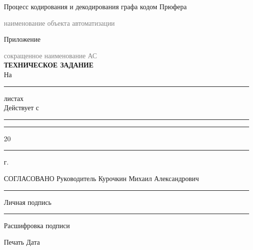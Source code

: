 \documentclass[12pt,a4paper]{article}
\begin{document}
\vspace{0.4cm}
\begin{center}
\large{Процесс кодирования и декодирования графа кодом Прюфера}
\end{center}
\vspace{-0.6cm}
\hrulefill
\begin{center}
\vspace{-0.4cm}
   \textcolor{gray}{\footnotesize{наименование объекта автоматизации}}
\end{center}
\vspace{0.4cm}
\begin{center}
\large{Приложение}
\end{center}
\vspace{-0.6cm}
\hrulefill
\begin{center}
\vspace{-0.4cm}
   \textcolor{gray}{\footnotesize{сокращенное наименование АС}}
   \\
   \vspace{0.8cm}
\Large{\textbf{ТЕХНИЧЕСКОЕ ЗАДАНИЕ}}\\
\vspace{0.6cm}
\normalsize
На \rule[0pt]{2cm}{0.5pt} листах\\
\vspace{0.3cm}
Действует с \guillemotleft \rule[0pt]{0.8cm}{0.5pt}\guillemotright \rule[0pt]{2cm}{0.5pt} 20\rule[0pt]{0.5cm}{0.5pt} г.
\end{center}
\vspace{0.8cm}
СОГЛАСОВАНО\vspace{0.3cm}\newline
 Руководитель \vspace{0.3cm}\newline
 Курочкин Михаил Александрович\vspace{0.3cm}\newline
 \rule[0pt]{4cm}{0.5pt} \newline
 \begin{small}Личная подпись\end{small} \newline
 \rule[0pt]{4cm}{0.5pt} \newline
 \begin{small}Расшифровка подписи\end{small} \vspace{0.1cm}\newline
Печать\vspace{0.3cm}\newline
Дата 
\newpage
\tableofcontents
\newpage
\end{document}

